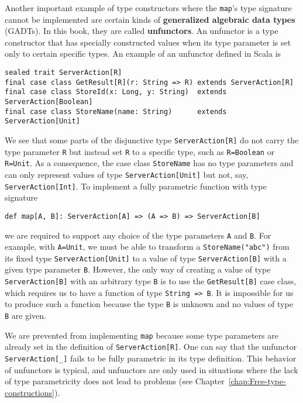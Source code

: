 Another important example of type constructors where the \lstinline!map!'s
type signature cannot be implemented are certain kinds of \textbf{generalized
algebraic data types} (GADTs). In this book, they are
called \textbf{unfunctors}. An unfunctor is a type
constructor that has specially constructed values when its type parameter
is set only to certain specific types. An example of an unfunctor
defined in Scala is
\begin{lstlisting}
sealed trait ServerAction[R]
final case class GetResult[R](r: String => R) extends ServerAction[R]
final case class StoreId(x: Long, y: String)  extends ServerAction[Boolean]
final case class StoreName(name: String)      extends ServerAction[Unit]
\end{lstlisting}
We see that some parts of the disjunctive type \lstinline!ServerAction[R]!
do not carry the type parameter \lstinline!R! but instead set \lstinline!R!
to a specific type, such as \lstinline!R=Boolean! or \lstinline!R=Unit!.
As a consequence, the case class \lstinline!StoreName! has no type
parameters and can only represent values of type \lstinline!ServerAction[Unit]!
but not, say, \lstinline!ServerAction[Int]!. To implement a fully
parametric function with type signature
\begin{lstlisting}
def map[A, B]: ServerAction[A] => (A => B) => ServerAction[B]
\end{lstlisting}
we are required to support any choice of the type parameters \lstinline!A!
and \lstinline!B!. For example, with \lstinline!A=Unit!, we must
be able to transform a \lstinline!StoreName("abc")! from its fixed
type \lstinline!ServerAction[Unit]! to a value of type \lstinline!ServerAction[B]!
with a given type parameter \lstinline!B!. However, the only way
of creating a value of type \lstinline!ServerAction[B]! with an arbitrary
type \lstinline!B! is to use the \lstinline!GetResult[B]! case class,
which requires us to have a function of type \lstinline!String => B!.
It is impossible for us to produce such a function because the type
\lstinline!B! is unknown and no values of type \lstinline!B! are
given. 

We are prevented from implementing \lstinline!map! because some type
parameters are already set in the definition of \lstinline!ServerAction[R]!.
One can say that the unfunctor \lstinline!ServerAction[_]! fails
to be fully parametric in its type definition. This behavior of unfunctors
is typical, and unfunctors are only used in situations where the lack
of type parametricity does not lead to problems (see Chapter~\ref{chap:Free-type-constructions}).

